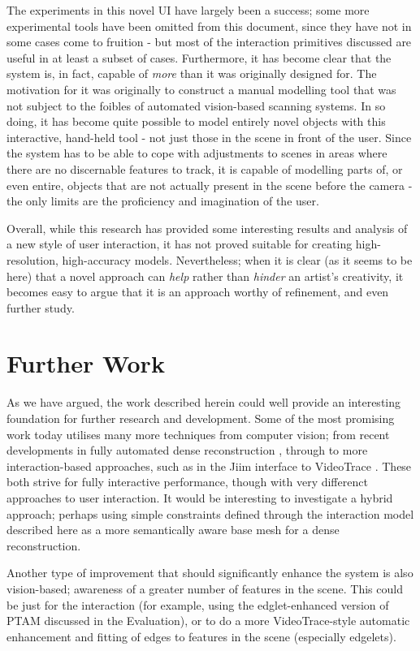 \documentclass[a4paper,10pt]{article}
\begin{document}
The experiments in this novel UI have largely been a success; some more experimental tools have been omitted from this document, since they have not in some cases come to fruition - but most of the interaction primitives discussed are useful in at least a subset of cases. Furthermore, it has become clear that the system is, in fact, capable of \textit{more} than it was originally designed for. The motivation for it was originally to construct a manual modelling tool that was not subject to the foibles of automated vision-based scanning systems. In so doing, it has become quite possible to model entirely novel objects with this interactive, hand-held tool - not just those in the scene in front of the user. Since the system has to be able to cope with adjustments to scenes in areas where there are no discernable features to track, it is capable of modelling parts of, or even entire, objects that are not actually present in the scene before the camera - the only limits are the proficiency and imagination of the user.

Overall, while this research has provided some interesting results and analysis of a new style of user interaction, it has not proved suitable for creating high-resolution, high-accuracy models. Nevertheless; when it is clear (as it seems to be here) that a novel approach can \textit{help} rather than \textit{hinder} an artist's creativity, it becomes easy to argue that it is an approach worthy of refinement, and even further study.

\clearpage

\section{Further Work}
As we have argued, the work described herein could well provide an interesting foundation for further research and development. Some of the most promising work today utilises many more techniques from computer vision; from recent developments in fully automated dense reconstruction \cite{denserecon}, through to more interaction-based approaches, such as in the Jiim interface to VideoTrace \cite{jiim}. These both strive for fully interactive performance, though with very differenct approaches to user interaction. It would be interesting to investigate a hybrid approach; perhaps using simple constraints defined through the interaction model described here as a more semantically aware base mesh for a dense reconstruction.

Another type of improvement that should significantly enhance the system is also vision-based; awareness of a greater number of features in the scene. This could be just for the interaction (for example, using the edglet-enhanced version of PTAM discussed in the Evaluation), or to do a more VideoTrace-style automatic enhancement and fitting of edges to features in the scene (especially edgelets).
\end{document}
